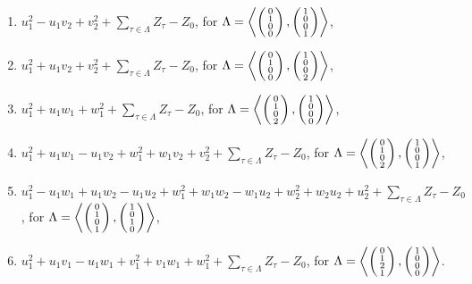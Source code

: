 \begin{prop}
\begin{enumerate}
\item
$u_1^2-u_1v_2+v_2^2+ \sum_{\tau\in \Lambda} Z_\tau-Z_0$, for  $\Lambda = \plan{0\\1\\0\\0}{1\\0\\0\\1}$,
\item
$u_1^2+u_1v_2+v_2^2+\sum_{\tau\in \Lambda} Z_\tau-Z_0$, for $\Lambda= \plan{0\\1\\0\\0}{1\\0\\0\\2}$,
\item
$u_1^2+u_1w_1+w_1^2+\sum_{\tau\in \Lambda} Z_\tau-Z_0$, for $\Lambda = \plan{0\\1\\0\\2}{1\\0\\0\\0}$,
\item
$u_1^2+u_1w_1-u_1v_2+w_1^2+w_1v_2+v_2^2+\sum_{\tau\in \Lambda} Z_\tau-Z_0$, for $\Lambda = \plan{0\\1\\0\\2}{1\\0\\0\\1}$,
\item
$u_1^2-u_1w_1+u_1w_2-u_1u_2+w_1^2+w_1w_2-w_1u_2+w_2^2+w_2u_2+u_2^2+\sum_{\tau\in \Lambda} Z_\tau-Z_0$, for  $\Lambda = \plan{0\\1\\0\\1}{1\\0\\1\\0}$,
\item
$u_1^2+u_1v_1-u_1w_1+v_1^2+v_1w_1+w_1^2+\sum_{\tau\in \Lambda} Z_\tau-Z_0$, for $\Lambda = \plan{0\\1\\2\\1}{1\\0\\0\\0}$.
\end{enumerate}
\end{prop}